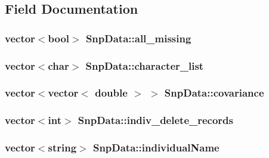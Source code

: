 \subsection{Field Documentation}
\hypertarget{classSnpData_a6a43ad849a99b9ecffa9de59a876187e}{
\subsubsection[{all\_\-missing}]{\setlength{\rightskip}{0pt plus 5cm}vector$<$bool$>$ {\bf SnpData::all\_\-missing}}}
\label{classSnpData_a6a43ad849a99b9ecffa9de59a876187e}
\hypertarget{classSnpData_a3e88fcb82912de7cb1e37e2630bbee71}{
\subsubsection[{character\_\-list}]{\setlength{\rightskip}{0pt plus 5cm}vector$<$char$>$ {\bf SnpData::character\_\-list}}}
\label{classSnpData_a3e88fcb82912de7cb1e37e2630bbee71}
\hypertarget{classSnpData_a26418125e4106520772b256d22b3a5c2}{
\subsubsection[{covariance}]{\setlength{\rightskip}{0pt plus 5cm}vector$<$vector$<$ double $>$ $>$ {\bf SnpData::covariance}}}
\label{classSnpData_a26418125e4106520772b256d22b3a5c2}
\hypertarget{classSnpData_a0b3e8c850f1bef514eb74c77011557e8}{
\subsubsection[{indiv\_\-delete\_\-records}]{\setlength{\rightskip}{0pt plus 5cm}vector$<$int$>$ {\bf SnpData::indiv\_\-delete\_\-records}}}
\label{classSnpData_a0b3e8c850f1bef514eb74c77011557e8}
\hypertarget{classSnpData_a2c8efb31ae7abca0dffa3ae2e54b4eaa}{
\subsubsection[{individualName}]{\setlength{\rightskip}{0pt plus 5cm}vector$<$string$>$ {\bf SnpData::individualName}}}
